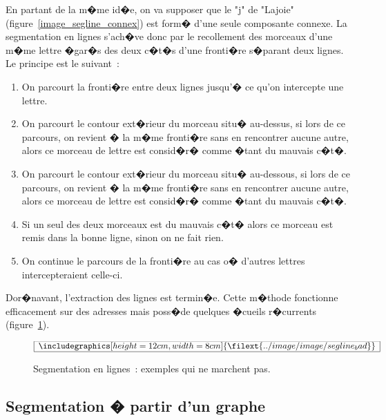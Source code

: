 En partant de la m�me id�e, on va supposer que le "j" de "Lajoie" (figure~\ref{image_segline_connex}) est form� d'une seule composante connexe. La segmentation en lignes s'ach�ve donc par le recollement des morceaux d'une m�me lettre �gar�s des deux c�t�s d'une fronti�re s�parant deux lignes. Le principe est le suivant~:

            \begin{enumerate}
            \item On parcourt la fronti�re entre deux lignes jusqu'� ce qu'on intercepte une lettre.
            \item On parcourt le contour ext�rieur du morceau situ� au-dessus, si lors de ce parcours, 
                            on revient � la m�me fronti�re sans en rencontrer aucune autre, alors ce morceau de 
                            lettre est consid�r� comme �tant du mauvais c�t�.
            \item On parcourt le contour ext�rieur du morceau situ� au-dessous, si lors de ce parcours, 
                            on revient � la m�me fronti�re sans en rencontrer aucune autre, alors ce morceau de 
                            lettre est consid�r� comme �tant du mauvais c�t�.
            \item Si un seul des deux morceaux est du mauvais c�t� alors ce morceau est remis dans la bonne ligne, 
                            sinon on ne fait rien.
            \item On continue le parcours de la fronti�re au cas o� d'autres lettres intercepteraient celle-ci.
            \end{enumerate}

Dor�navant, l'extraction des lignes est termin�e. Cette m�thode fonctionne efficacement sur des adresses mais poss�de quelques �cueils r�currents (figure~\ref{image_segline_bad}).


            \begin{figure}[t]
        $$\frame{$\begin{array}[c]{c}\includegraphics[height=12cm, width=8cm]
        {\filext{../image/image/segline_bad}}\end{array}$}$$
        \caption{Segmentation en lignes~: exemples qui ne marchent pas.}
        \label{image_segline_bad}
            \end{figure}








\subsection{Segmentation � partir d'un graphe}



